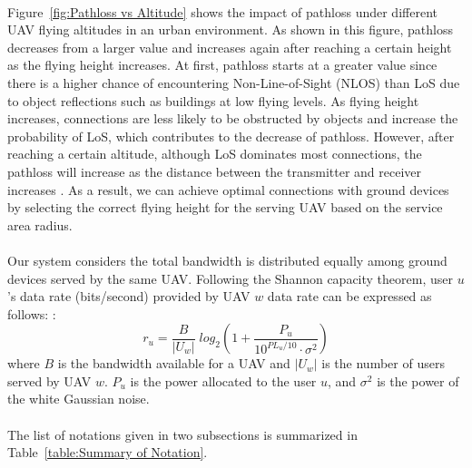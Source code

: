 \documentclass[a4paper,12pt]{report}
\begin{document}
\paragraph{}
Figure~\ref{fig:Pathloss vs Altitude} shows the impact of pathloss under different UAV flying altitudes in an urban environment. As shown in this figure, pathloss decreases from a larger value and increases again after reaching a certain height as the flying height increases. At first, pathloss starts at a greater value since there is a higher chance of encountering Non-Line-of-Sight (NLOS) than LoS due to object reflections such as buildings at low flying levels. As flying height increases, connections are less likely to be obstructed by objects and increase the probability of LoS, which contributes to the decrease of pathloss. However, after reaching a certain altitude, although LoS dominates most connections, the pathloss will increase as the distance between the transmitter and receiver increases \cite{b7}\cite{b8}. As a result, we can achieve optimal connections with ground devices by selecting the correct flying height for the serving UAV based on the service area radius.
\paragraph{}
Our system considers the total bandwidth is distributed equally among ground devices served by the same UAV. Following the Shannon capacity theorem, user $u$'s data rate (bits/second) provided by UAV $w$ data rate can be expressed as follows: \cite{b21}:
\begin{equation}
    r_{u} = \frac{B}{|U_{w}|}\;log_{2}(1+\frac{P_{u}}{10^{PL_{u}/10}\cdot{\sigma ^{2}}})
\end{equation}
where $B$ is the bandwidth available for a UAV and $|U_{w}|$ is the number of users served by UAV $w$. $P_{u}$ is the power allocated to the user $u$, and $\sigma ^{2}$ is the power of the white Gaussian noise.
\paragraph{}
The list of notations given in two subsections is summarized in Table~\ref{table:Summary of Notation}.
\end{document}
